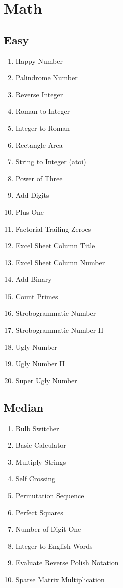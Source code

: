 \documentclass[DIV=calc, paper=a4, fontsize=11pt, twocolumn]{scrartcl}	 %
\begin{document}

\section*{Math}

\subsection*{Easy}
\begin{enumerate}
\item Happy Number    \cite{202}
\item Palindrome Number \cite{009}
\item Reverse Integer \cite{007}
\item Roman to Integer   \cite{013}
\item Integer to Roman \cite{012}
\item Rectangle Area \cite{223}
\item String to Integer (atoi) \cite{008}
\item Power of Three   \cite{326}
\item {\color{red} Add Digits}   \cite{258}
\item Plus One    \cite{066}
\item Factorial Trailing Zeroes   \cite{172}
\item Excel Sheet Column Title    \cite{168}
\item Excel Sheet Column Number   \cite{171}
\item Add Binary \cite{067}
\item Count Primes   \cite{204}
\item Strobogrammatic Number \cite{246}
\item Strobogrammatic Number II  \cite{247}
\item Ugly Number    \cite{263}
\item {\color{red} Ugly Number II}    \cite{264}
\item {\color{red} Super Ugly Number} \cite{313}
\end{enumerate}

\subsection*{Median}
\begin{enumerate}
\item Bulb Switcher   \cite{319}
\item Basic Calculator    \cite{224}
\item Multiply Strings   \cite{043}
\item Self Crossing  \cite{335}
\item {\color{red} Permutation Sequence}  \cite{060}
\item Perfect Squares   \cite{279}
\item Number of Digit One   \cite{233}
\item Integer to English Words \cite{273}
\item Evaluate Reverse Polish Notation \cite{150}
\item Sparse Matrix Multiplication \cite{311}
\end{enumerate}
\end{document}
